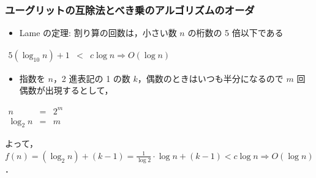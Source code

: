 \begin{frame}[shrink]
\frametitle{ユーグリットの互除法とべき乗のアルゴリズムのオーダ}
  \begin{example}[ユーグリットの互除法]
    \begin{itemize}
\item Lame の定理: 割り算の回数は，小さい数 $n$ の桁数の 5 倍以下である
    \end{itemize}
    \begin{center}  
      \begin{math}
        \begin{array}{rcl}
5(\log_{10}n)+1&<&c\log n\Rightarrow O(\log n)
        \end{array}
      \end{math}
    \end{center}
  \end{example}
  \begin{example}[べき乗]
    \begin{itemize}
\item 指数を $n$，2 進表記の 1 の数 $k$，偶数のときはいつも半分になるので $m$ 回偶数が出現するとして，
    \end{itemize}
    \begin{center}
      \begin{math}
        \begin{array}{rcl}
n&=&2^m\\
\log_2 n &=& m
        \end{array}
      \end{math}
    \end{center}
よって， \(f(n)=(\log_2 n)+(k-1)=\frac{1}{\log 2}\cdot\log n+(k-1)<c\log n\Rightarrow O(\log n)\)．
  \end{example}
\end{frame}
